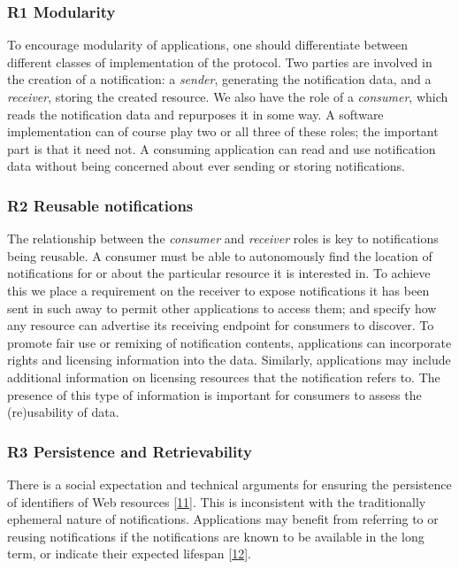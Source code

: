 \documentclass[]{article}
\begin{document}
\hypertarget{modularity}{}
\subsubsection{R1 Modularity}\label{r1-modularity}

To encourage modularity of applications, one should differentiate
between different classes of implementation of the protocol. Two parties
are involved in the creation of a notification: a \emph{sender},
generating the notification data, and a \emph{receiver}, storing the
created resource. We also have the role of a \emph{consumer}, which
reads the notification data and repurposes it in some way. A software
implementation can of course play two or all three of these roles; the
important part is that it need not. A consuming application can read and
use notification data without being concerned about ever sending or
storing notifications.

\hypertarget{reusable-notifications}{}
\subsubsection{R2 Reusable
notifications}\label{r2-reusable-notifications}

The relationship between the \emph{consumer} and \emph{receiver} roles
is key to notifications being reusable. A consumer must be able to
autonomously find the location of notifications for or about the
particular resource it is interested in. To achieve this we place a
requirement on the receiver to expose notifications it has been sent in
such away to permit other applications to access them; and specify how
any resource can advertise its receiving endpoint for consumers to
discover. To promote fair use or remixing of notification contents,
applications can incorporate rights and licensing information into the
data. Similarly, applications may include additional information on
licensing resources that the notification refers to. The presence of
this type of information is important for consumers to assess the
(re)usability of data.

\hypertarget{persistence-and-retrievability}{}
\subsubsection{R3 Persistence and
Retrievability}\label{r3-persistence-and-retrievability}

There is a social expectation and technical arguments for ensuring the
persistence of identifiers of Web resources
{[}\protect\hyperlink{ref-11}{11}{]}. This is inconsistent with the
traditionally ephemeral nature of notifications. Applications may
benefit from referring to or reusing notifications if the notifications
are known to be available in the long term, or indicate their expected
lifespan {[}\protect\hyperlink{ref-12}{12}{]}.
\end{document}
